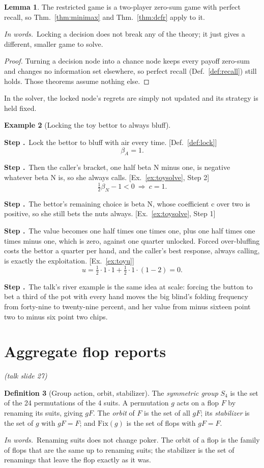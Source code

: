 \documentclass[11pt]{article}
\theoremstyle{definition}
\newtheorem{definition}{Definition}[section]
\newtheorem{example}[definition]{Example}
\newtheorem{lemma}[definition]{Lemma}
\newcommand{\inwords}{\par\smallskip\noindent\textit{In words.}\ }
\newcounter{stp}
\newcommand{\steps}{\setcounter{stp}{0}}
\newcommand{\st}{\stepcounter{stp}\par\medskip\noindent\textbf{Step \arabic{stp}.}\ }
\newcommand{\by}[1]{\hfill{\small\color{blue!50!black}[#1]}}
\newcommand{\Def}[1]{Def.~\ref{#1}}\newcommand{\Lem}[1]{Lemma~\ref{#1}}\newcommand{\Thm}[1]{Thm.~\ref{#1}}
\newcommand{\Ex}[1]{Ex.~\ref{#1}}\newcommand{\Rem}[1]{Remark~\ref{#1}}\newcommand{\Alg}[1]{Alg.~\ref{#1}}\newcommand{\Cor}[1]{Cor.~\ref{#1}}
\newcommand{\slide}[1]{\hfill{\small\itshape (talk slide #1)}}
\begin{document}
\begin{lemma}\label{lem:lock}
The restricted game is a two-player zero-sum game with perfect recall, so \Thm{thm:minimax} and \Thm{thm:dcfr} apply to it.
\inwords Locking a decision does not break any of the theory; it just gives a different, smaller game to solve.
\end{lemma}
\begin{proof}
Turning a decision node into a chance node keeps every payoff zero-sum and changes no information set elsewhere, so
perfect recall (\Def{def:recall}) still holds. Those theorems assume nothing else.
\end{proof}
In the solver, the locked node's regrets are simply not updated and its strategy is held fixed.

\begin{example}[Locking the toy bettor to always bluff]\label{ex:lock}
\steps
\st Lock the bettor to bluff with air every time. \by{\Def{def:lock}}
\[ \beta_A=1. \]
\st Then the caller's bracket, one half beta N minus one, is negative whatever beta N is, so she always calls.
\by{\Ex{ex:toysolve}, Step 2}
\[ \tfrac12\beta_N-1<0\ \Rightarrow\ c=1. \]
\st The bettor's remaining choice is beta N, whose coefficient c over two is positive, so she still bets the nuts always.
\by{\Ex{ex:toysolve}, Step 1}
\st The value becomes one half times one times one, plus one half times one times minus one, which is zero, against one
quarter unlocked. Forced over-bluffing costs the bettor a quarter per hand, and the caller's best response, always calling,
is exactly the exploitation. \by{\Ex{ex:toyu}}
\[ u=\tfrac12\cdot1\cdot1+\tfrac12\cdot1\cdot(1-2)=0. \]
\st The talk's river example is the same idea at scale: forcing the button to bet a third of the pot with every hand moves
the big blind's folding frequency from forty-nine to twenty-nine percent, and her value from minus sixteen point two to
minus six point two chips.
\end{example}

\section{Aggregate flop reports}\label{sec:report}\slide{27}
\begin{definition}[Group action, orbit, stabilizer]\label{def:group}
The \emph{symmetric group} $S_4$ is the set of the 24 permutations of the 4 suits. A permutation $g$ acts on a flop $F$ by
renaming its suits, giving $gF$. The \emph{orbit} of $F$ is the set of all $gF$; its \emph{stabilizer} is the set of $g$ with
$gF=F$; and $\mathrm{Fix}(g)$ is the set of flops with $gF=F$.
\inwords Renaming suits does not change poker. The orbit of a flop is the family of flops that are the same up to
renaming suits; the stabilizer is the set of renamings that leave the flop exactly as it was.
\end{definition}
\end{document}
